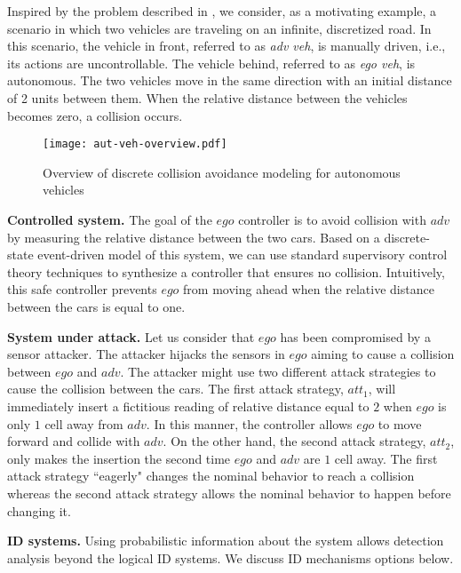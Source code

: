Inspired by the problem described in \citep{meira-goes:2020towards}, we consider, as a motivating example, a scenario in which two vehicles are traveling on an infinite, discretized road. In this scenario, the vehicle in front, referred to as \emph{adv veh}, is manually driven, i.e., its actions are uncontrollable. 
The vehicle behind, referred to as \emph{ego veh}, is autonomous.
The two vehicles move in the same direction with an initial distance of 2 units between them.
When the relative distance between the vehicles becomes zero, a collision occurs.


\begin{figure}[h]
    \centering
    \texttt{[image: aut-veh-overview.pdf]} 
    \caption{Overview of discrete collision avoidance modeling for autonomous vehicles} 
    \label{Example} 
\end{figure}

\noindent \textbf{Controlled system.} 
The goal of the $ego$ controller is to avoid collision with $adv$ by measuring the relative distance between the two cars.
Based on a discrete-state event-driven model of this system, we can use standard supervisory control theory techniques to synthesize a controller that ensures no collision.
Intuitively, this safe controller prevents $ego$ from moving ahead when the relative distance between the cars is equal to one. 

\noindent \textbf{System under attack.} 
Let us consider that $ego$ has been compromised by a sensor attacker.
The attacker hijacks the sensors in $ego$ aiming to cause a collision between $ego$ and $adv$. 
The attacker might use two different attack strategies to cause the collision between the cars.
The first attack strategy, $att_1$, will immediately insert a fictitious reading of relative distance equal to $2$ when $ego$ is only $1$ cell away from $adv$. 
In this manner, the controller allows $ego$ to move forward and collide with $adv$. 
On the other hand, the second attack strategy, $att_2$, only makes the insertion the second time $ego$ and $adv$ are $1$ cell away.
The first attack strategy ``eagerly" changes the nominal behavior to reach a collision whereas the second attack strategy allows the nominal behavior to happen before changing it.

\noindent \textbf{ID systems.}
Using probabilistic information about the system allows detection analysis beyond the logical ID systems.
We discuss ID mechanisms options below. 

